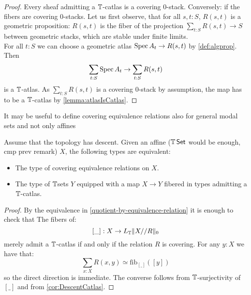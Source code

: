 \begin{proof}
	Every sheaf admitting a $\mathbb{T}$-catlas is a covering 0-stack. 
	Conversely: if the fibers are covering 0-stacks. Let us first observe, that for all $s , t : S$, $R(s,t)$ is a geometric proposition: $R(s,t)$ is the fiber of the projection $\sum_{t : S} R(s,t) \to S$ between geometric stacks, which are stable under finite limits. \\
	
	For all $t : S$ we can choose a geometric atlas $\operatorname{Spec} A_t \to R(s,t)$ by \ref{def:algprop}. Then 
	\[
	\sum_{t:S} \operatorname{Spec} A_t \to \sum_{t : S} R(s,t)
	\]
	is a $\mathbb{T}$-atlas. As $\sum_{t : S} R(s,t)$ is a covering 0-stack by assumption, the map has to be a $\mathbb{T}$-catlas by \ref{lemma:atlasIsCatlas}. 
\end{proof}
\begin{think}
	It may be useful to define covering equivalence relations also for general modal sets and not only affines
\end{think}

\begin{lemma}{\label{lemma:fundamental-property-algebraic-spaces}}
	Assume that the topology has descent.
	Given an affine ($\mathbb{T} \operatorname{\mathsf {Set}}$ would be enough, cmp prev remark) $X$, the following types are equivalent:
	\begin{itemize}
		\item The type of covering equivalence relations on $X$.
		\item The type of $\mathbb{T}$sets $Y$ equipped with a map $X \to Y$ fibered in types admitting a $\mathbb{T}$-catlas.
	\end{itemize}
\end{lemma}

\begin{proof}
	By the equivalence in \ref{quotient-by-equivalence-relation} it is enough to check that
		The fibers of: 
		\[[\_]:X\to L_{\mathbb{T}} \| X//R \|_0\] 
		merely admit a $\mathbb{T}$-catlas if and only if the relation $R$ is covering. For any $y:X$ we have that:
		\[\sum_{x:X} R(x,y) \simeq \mathrm{fib}_{[\_]}([y])\]
		so the direct direction is immediate. The converse follows from $\mathbb{T}$-surjectivity of $[\_]$ and from \ref{cor:DescentCatlas}.
\end{proof}

